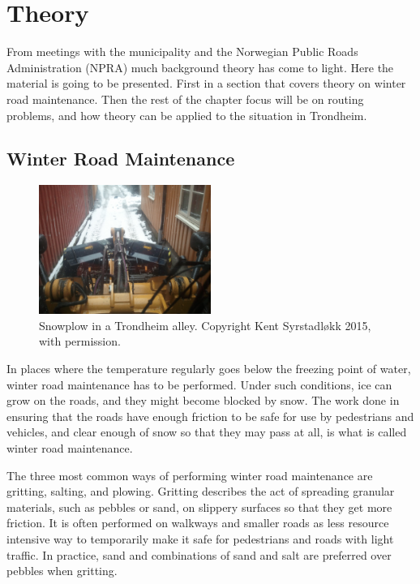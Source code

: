 \chapter{Theory}
\label{theory}

From meetings with the municipality and the Norwegian Public Roads Administration (NPRA) much background theory has come to light. Here the material is going to be presented. First in a section that covers theory on winter road maintenance. Then the rest of the chapter focus will be on routing problems, and how theory can be applied to the situation in Trondheim.

\section{Winter Road Maintenance} %
\label{sec:snow_plowing}

\begin{figure}
    \begin{center}
        \includegraphics[width=0.5\textwidth]{figures/MachineryIllustrations/snowplow-Kent_Syrstadlokk-2012-04-18.jpg}
    \end{center}
    \caption{Snowplow in a Trondheim alley. Copyright Kent Syrstadløkk 2015, with permission.}
    \label{fig:snowplow_in_alley}
\end{figure}

In places where the temperature regularly goes below the freezing point of water, winter road maintenance has to be performed. Under such conditions, ice can grow on the roads, and they might become blocked by snow. The work done in ensuring that the roads have enough friction to be safe for use by pedestrians and vehicles, and clear enough of snow so that they may pass at all, is what is called winter road maintenance.

The three most common ways of performing winter road maintenance are gritting, salting, and plowing. Gritting describes the act of spreading granular materials, such as pebbles or sand, on slippery surfaces so that they get more friction. It is often performed on walkways and smaller roads as less resource intensive way to temporarily make it safe for pedestrians and roads with light traffic. In practice, sand and combinations of sand and salt are preferred over pebbles when gritting.

